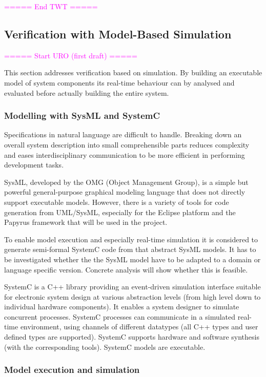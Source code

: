 \documentclass{template/openetcs_report}
\begin{document}
\textcolor{magenta}{===== End TWT =====}

\subsection{Verification with Model-Based Simulation}
\label{sct:uro:systemc}

\textcolor{magenta}{===== Start URO (first draft) =====}

This section addresses verification based on simulation. By building an executable model of system components its real-time behaviour can by analysed and evaluated before actually building the entire system.

\subsubsection{Modelling with SysML and SystemC}

Specifications in natural language are difficult to handle. Breaking down an overall system description into small comprehensible parts reduces complexity and eases interdisciplinary communication to be more efficient in performing development tasks.

SysML, developed by the OMG (Object Management Group), is a simple but powerful general-purpose graphical modeling language that does not directly support executable models. However, there is a variety of tools for code generation from UML/SysML, especially for the Eclipse platform and the Papyrus framework that will be used in the project.

To enable model execution and especially real-time simulation it is considered to generate semi-formal SystemC code from that abstract SysML models. It has to be investigated whether the the SysML model have to be adapted to a domain or language specific version. Concrete analysis will show whether this is feasible.

SystemC is a C++ library providing an event-driven simulation interface suitable for electronic system design at various abstraction levels (from high level down to individual hardware components). It enables a system designer to simulate concurrent processes. SystemC processes can communicate in a simulated real-time environment, using channels of different datatypes (all C++ types and user defined types are supported). SystemC supports hardware and software synthesis (with the corresponding tools). SystemC models are executable.

\subsubsection{Model execution and simulation}
\end{document}
